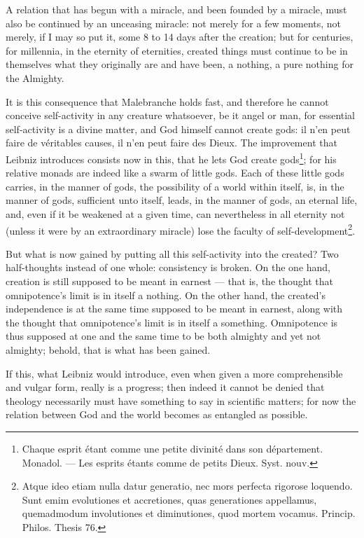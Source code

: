 \documentclass[12pt,a4paper]{article}
\begin{document}
A relation that has begun with a miracle, and been founded by a miracle, must also
be continued by an unceasing miracle: not merely for a few moments, not merely, if
I may so put it, some 8 to 14 days after the creation; but for centuries, for
millennia, in the eternity of eternities, created things must continue to be in
themselves what they originally are and have been, a nothing, a pure nothing for
the Almighty.

It is this consequence that Malebranche holds fast, and therefore he cannot
conceive self-activity in any creature whatsoever, be it angel or man, for
essential self-activity is a divine matter, and God himself cannot create gods: il
n'en peut faire de véritables causes, il n'en peut faire des Dieux.
The improvement that Leibniz introduces consists now in this, that he lets God
create gods\footnote{Chaque esprit étant comme une petite divinité dans son
département. Monadol. --- Les esprits étants comme de petits Dieux. Syst. nouv.};
for his relative monads are indeed like a swarm of little gods. Each of these
little gods carries, in the manner of gods, the possibility of a world within
itself, is, in the manner of gods, sufficient unto itself, leads, in the manner of
gods, an eternal life, and, even if it be weakened at a given time, can
nevertheless in all eternity not (unless it were by an extraordinary miracle) lose
the faculty of self-development\footnote{Atque ideo etiam nulla datur generatio, nec
mors perfecta rigorose loquendo. Sunt emim evolutiones et accretiones, quas
generationes appellamus, quemadmodum involutiones et diminutiones, quod mortem
vocamus. Princip. Philos. Thesis 76.}.

But what is now gained by putting all this self-activity into the created? Two
half-thoughts instead of one whole: consistency is broken. On the one hand,
creation is still supposed to be meant in earnest --- that is, the thought that
omnipotence's limit is in itself a nothing. On the other hand, the created's
independence is at the same time supposed to be meant in earnest, along with the
thought that omnipotence's limit is in itself a something. Omnipotence is thus
supposed at one and the same time to be both almighty and yet not almighty; behold,
that is what has been gained.

If this, what Leibniz would introduce, even when given a more comprehensible and
vulgar form, really is a progress; then indeed it cannot be denied that theology
necessarily must have something to say in scientific matters; for now the relation
between God and the world becomes as entangled as possible.
\end{document}
